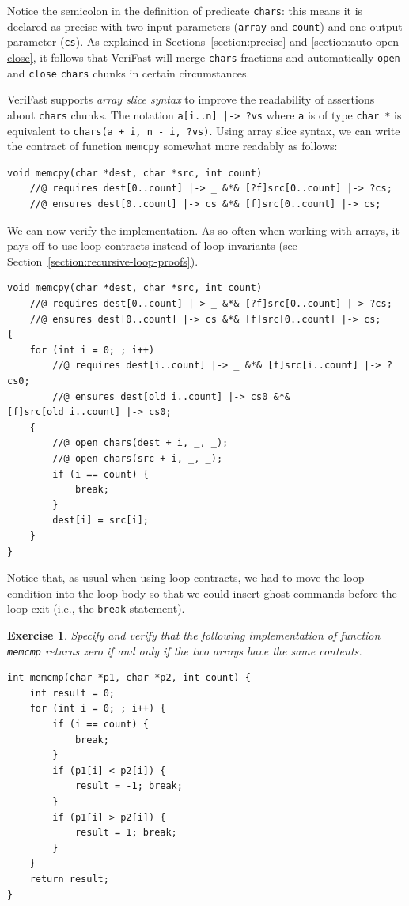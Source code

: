 \documentclass{article}
\newtheorem{exercise}{Exercise}
\begin{document}
Notice the semicolon in the definition of predicate
\lstinline|chars|: this means it is declared as precise with
two input parameters (\lstinline|array| and \lstinline|count|)
and one output parameter (\lstinline|cs|). As explained in
Sections~\ref{section:precise} and
\ref{section:auto-open-close}, it follows that VeriFast will
merge \lstinline|chars| fractions and automatically
\lstinline|open| and \lstinline|close| \lstinline|chars| chunks
in certain circumstances.

VeriFast supports \emph{array slice syntax} to improve the
readability of assertions about \lstinline|chars| chunks. The
notation \lstinline$a[i..n] |-> ?vs$ where \lstinline|a| is of
type \lstinline|char *| is equivalent to %
\lstinline$chars(a + i, n - i, ?vs)$. Using array slice syntax,
we can write the contract of function \lstinline|memcpy|
somewhat more readably as follows:
\begin{lstlisting}
void memcpy(char *dest, char *src, int count)
    //@ requires dest[0..count] |-> _ &*& [?f]src[0..count] |-> ?cs;
    //@ ensures dest[0..count] |-> cs &*& [f]src[0..count] |-> cs;
\end{lstlisting}

We can now verify the implementation. As so often when working
with arrays, it pays off to use loop contracts instead of loop
invariants (see Section~\ref{section:recursive-loop-proofs}).
\begin{lstlisting}
void memcpy(char *dest, char *src, int count)
    //@ requires dest[0..count] |-> _ &*& [?f]src[0..count] |-> ?cs;
    //@ ensures dest[0..count] |-> cs &*& [f]src[0..count] |-> cs;
{
    for (int i = 0; ; i++)
        //@ requires dest[i..count] |-> _ &*& [f]src[i..count] |-> ?cs0;
        //@ ensures dest[old_i..count] |-> cs0 &*& [f]src[old_i..count] |-> cs0;
    {
        //@ open chars(dest + i, _, _);
        //@ open chars(src + i, _, _);
        if (i == count) {
            break;
        }
        dest[i] = src[i];
    }
}
\end{lstlisting}
Notice that, as usual when using loop contracts, we had to move
the loop condition into the loop body so that we could insert
ghost commands before the loop exit (i.e., the
\lstinline|break| statement).

\begin{exercise}\label{exercise:memcmp}
Specify and verify that the following implementation of
function \lstinline|memcmp| returns zero if and only if the two
arrays have the same contents.
\begin{lstlisting}
int memcmp(char *p1, char *p2, int count) {
    int result = 0;
    for (int i = 0; ; i++) {
        if (i == count) {
            break;
        }
        if (p1[i] < p2[i]) {
            result = -1; break;
        }
        if (p1[i] > p2[i]) {
            result = 1; break;
        }
    }
    return result;
}
\end{lstlisting}
\end{exercise}
\end{document}

